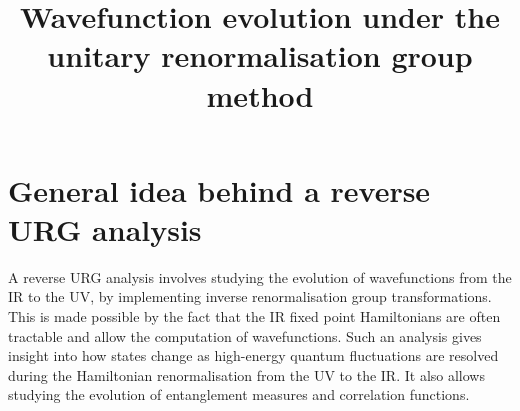 \documentclass[prb]{revtex4-2}
\begin{document}
\title{Wavefunction evolution under the unitary renormalisation group method}

\maketitle

\section{General idea behind a reverse URG analysis}
A reverse URG analysis involves studying the evolution of wavefunctions from the IR to the UV, by implementing inverse renormalisation group transformations. This is made possible by the fact that the IR fixed point Hamiltonians are often tractable and allow the computation of wavefunctions. Such an analysis gives insight into how states change as high-energy quantum fluctuations are resolved during the Hamiltonian renormalisation from the UV to the IR. It also allows studying the evolution of entanglement measures and correlation functions.
\end{document}

